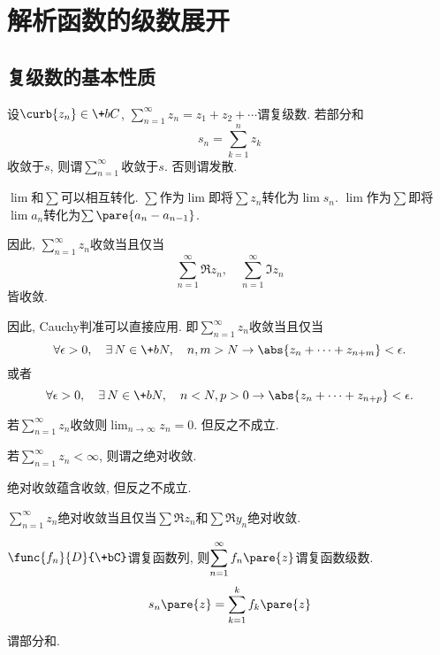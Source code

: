 \documentclass{ctexart}
\begin{document}
\section{解析函数的级数展开} %
\label{sec:解析函数的级数展开}

\subsection{复级数的基本性质} %
\label{sub:复级数的基本性质}

\begin{definition}
    设$\curb{z_n}\in\+bC$, $\displaystyle \sum_{n=1}^\infty z_n = z_1 + z_2 + \cdots$谓复级数. 若部分和
    \[ s_n = \sum_{k=1}^n z_k \]
    收敛于$s$, 则谓$\displaystyle \sum_{n=1}^\infty$收敛于$s$. 否则谓发散.
\end{definition}
\begin{remark}
    $\lim$和$\sum$可以相互转化. $\sum$作为$\lim$即将$\sum z_n$转化为$\lim s_n$. $\lim$作为$\sum$即将$\lim a_n$转化为$\sum \pare{a_n - a_{n-1}}$.
\end{remark}
\begin{remark}
    因此, $\displaystyle \sum_{n=1}^\infty z_n$收敛当且仅当
    \[ \sum_{n=1}^\infty  \Re z_n,\quad \sum_{n=1}^\infty \Im z_n \]
    皆收敛.
\end{remark}
\begin{remark}
    因此, Cauchy判准可以直接应用. 即$\displaystyle \sum_{n=1}^\infty z_n$收敛当且仅当
    \[ \forall \epsilon>0,\quad \exists\, N\in \+bN,\quad n,m>N \rightarrow \abs{z_n + \cdots + z_{n+m}} < \epsilon. \]
    或者
    \[ \forall \epsilon>0,\quad \exists\, N\in \+bN,\quad n<N, p>0\rightarrow \abs{z_n + \cdots + z_{n+p}} < \epsilon. \]
\end{remark}
\begin{remark}
    若$\displaystyle \sum_{n=1}^\infty z_n$收敛则$\displaystyle \lim_{n\rightarrow \infty} z_n = 0$. 但反之不成立.
\end{remark}
\begin{definition}
    若$\displaystyle \sum_{n=1}^\infty z_n < \infty$, 则谓之绝对收敛.
\end{definition}
\begin{remark}
    绝对收敛蕴含收敛, 但反之不成立.
\end{remark}
\begin{remark}
    $\displaystyle \sum_{n=1}^\infty z_n$绝对收敛当且仅当$\sum \Re z_n$和$\sum \Re y_n$绝对收敛.
\end{remark}
\begin{definition}
    $\func{f_n}{D}{\+bC}$谓复函数列, 则$\displaystyle \sum_{n=1}^\infty f_n\pare{z}$谓复函数级数.
    \[ s_n\pare{z} = \sum_{k=1}^k f_k\pare{z} \]
    谓部分和.
\end{definition}
\end{document}
